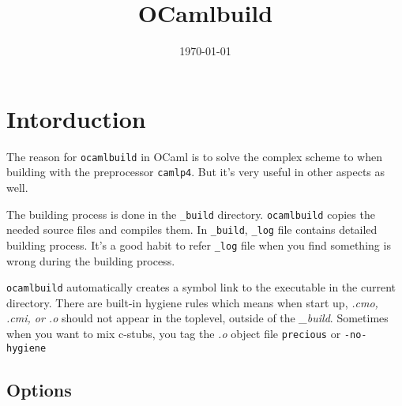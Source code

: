 \documentclass[11pt]{article}
\title{OCamlbuild}
\date{\today}
\begin{document}
\maketitle




\section*{Intorduction}
\label{sec-1}

  The reason for \texttt{ocamlbuild} in OCaml is to solve the complex scheme
  to when building with the preprocessor \texttt{camlp4}. But it's very useful
  in other aspects as well.

  The building process is done in the \texttt{\_build} directory. \texttt{ocamlbuild}
  copies the needed source files and compiles them.  In \texttt{\_build},
  \texttt{\_log} file contains detailed building process. It's a good habit to
  refer \texttt{\_log} file when you find something is wrong during the
  building process.

  \texttt{ocamlbuild} automatically creates a symbol link to the executable
  in the current directory.  There are built-in hygiene rules which
  means when start up, \emph{.cmo, .cmi, or .o} should not appear in the
  toplevel, outside of the \emph{_build}. Sometimes when you want to mix
  c-stubs, you tag the \emph{.o} object file \texttt{precious} or \texttt{-no-hygiene}
\subsection*{Options}
\label{sec-1-1}
\end{document}
